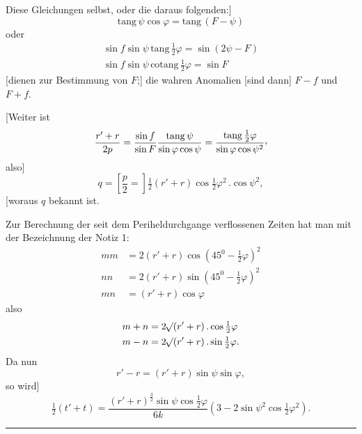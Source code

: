 Diese Gleichungen selbst, oder die daraus folgenden:]
\[
\mathrm{tang}\,\psi\cos\varphi=\mathrm{tang}\,(F-\psi)
\]
oder
\[
\begin{gathered}
\sin f\sin\psi\,\mathrm{tang}\,\tfrac12\varphi=\sin(2\psi-F)\\
\sin f\sin\psi\,\mathrm{cotang}\,\tfrac12\varphi=\sin F
\end{gathered}
\]
[dienen zur Bestimmung von \(F\);] die wahren Anomalien [sind dann] \(F-f\) und \(F+f\).

[Weiter ist
\[
\frac{r'+r}{2p}=\frac{\sin f}{\sin F}\frac{\mathrm{tang}\,\psi}{\sin\varphi\cos\psi}=\frac{\mathrm{tang}\,\tfrac12\varphi}{\sin\varphi\cos\psi^2}\mathpunct{\raisebox{.45ex}{,}}
\]
also]
\[
q=\left[\frac p2=\right]\tfrac12(r'+r)\cos\tfrac12\varphi^2\,.\cos\psi^2,
\]
[woraus \(q\) bekannt ist.

Zur Berechnung der seit dem Periheldurchgange verflossenen Zeiten hat man mit der Bezeichnung der Notiz 1:
\[
\begin{aligned}
mm&=2(r'+r)\cos(45^0-\tfrac12\varphi)^2\\
nn&=2(r'+r)\sin(45^0-\tfrac12\varphi)^2\\
mn&=(r'+r)\cos\varphi
\end{aligned}
\]
also
\[
\begin{aligned}
m+n&=2\mathord{{}^{}\!\surd}(r'+r)\,.\cos\tfrac12\varphi\\
m-n&=2\mathord{{}^{}\!\surd}(r'+r)\,.\sin\tfrac12\varphi.
\end{aligned}
\]
Da nun
\[
r'-r=(r'+r)\sin\psi\sin\varphi,
\]
so wird]
\[
\tfrac12(t'+t)=\frac{(r'+r)^{\frac32}\sin\psi\cos\tfrac12\varphi}{6k}(3-2\sin\psi^2\cos\tfrac12\varphi^2).
\]
\begin{center}\rule{.3\linewidth}{.4pt}\end{center}
